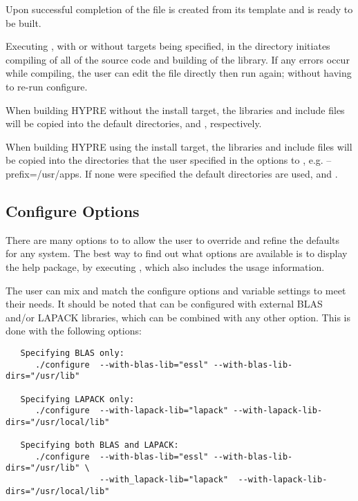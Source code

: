 Upon successful completion of  the file  
is created from its template  and \hypre{} is 
ready to be built.

Executing , with or without targets being specified, in the 
directory initiates compiling of all of the source code and building of the \hypre{} 
library.  If any errors occur while compiling, the user can edit the file 
 directly then run  again; without having to 
re-run configure.

When building HYPRE without the install target, the libraries and include files 
will be copied into the default directories,  and 
, respectively.

When building HYPRE using the install target, the libraries and include files 
will be copied into the directories that the user specified in the options to 
, e.g. --prefix=/usr/apps.  If none were specified the default 
directories are used,  and .


\subsection{Configure Options}

There are many options to  to allow the user to override and 
refine the defaults for any system. The best way to find out what options are 
available is to display the help package, by executing , which 
also includes the usage information.

The user can mix and match the configure options and variable settings to meet their 
needs.  It should be noted that \hypre{} can be configured with external BLAS and/or
LAPACK libraries, which can be combined with any other option.  This is done with
the following options:

\begin{verbatim}
   Specifying BLAS only:
      ./configure  --with-blas-lib="essl" --with-blas-lib-dirs="/usr/lib"

   Specifying LAPACK only:
      ./configure  --with-lapack-lib="lapack" --with-lapack-lib-dirs="/usr/local/lib"

   Specifying both BLAS and LAPACK:
      ./configure  --with-blas-lib="essl" --with-blas-lib-dirs="/usr/lib" \
                   --with_lapack-lib="lapack"  --with-lapack-lib-dirs="/usr/local/lib"
\end{verbatim}



